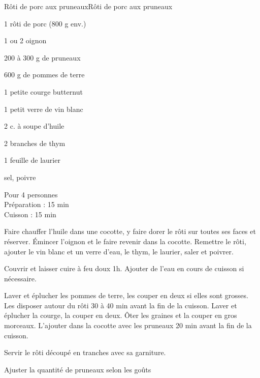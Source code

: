 \begin{recette}{Rôti de porc aux pruneaux}{Rôti de porc aux pruneaux}

\begin{ingredients}
1 rôti de porc (800 g env.)\par
1 ou 2 oignon\par
200 à 300 g de pruneaux\par
600 g de pommes de terre\par
1 petite courge butternut\par
1 petit verre de vin blanc\par
2 c. à soupe d'huile\par
2 branches de thym\par
1 feuille de laurier\par
sel, poivre\par
\end{ingredients}

\begin{infos}
Pour 4 personnes\\
Préparation : 15 min\\
Cuisson : 15 min\\
\end{infos}

\begin{etapes}
\item Faire chauffer l'huile dans une cocotte, y faire dorer le rôti sur toutes ses faces et réserver. Émincer l'oignon et le faire revenir dans la cocotte. Remettre le rôti, ajouter le vin blanc et un verre d'eau, le thym, le laurier, saler et poivrer.
\item Couvrir et laisser cuire à feu doux 1h. Ajouter de l'eau en cours de cuisson si nécessaire.
\item Laver et éplucher les pommes de terre, les couper en deux si elles sont grosses. Les disposer autour du rôti 30 à 40 min avant la fin de la cuisson. Laver et éplucher la courge, la couper en deux. Ôter les graines et la couper en gros morceaux. L'ajouter dans la cocotte avec les pruneaux 20 min avant la fin de la cuisson.
\item Servir le rôti découpé en tranches avec sa garniture.
\end{etapes}

\begin{conseils}
Ajuster la quantité de pruneaux selon les goûts
\end{conseils}

\end{recette}